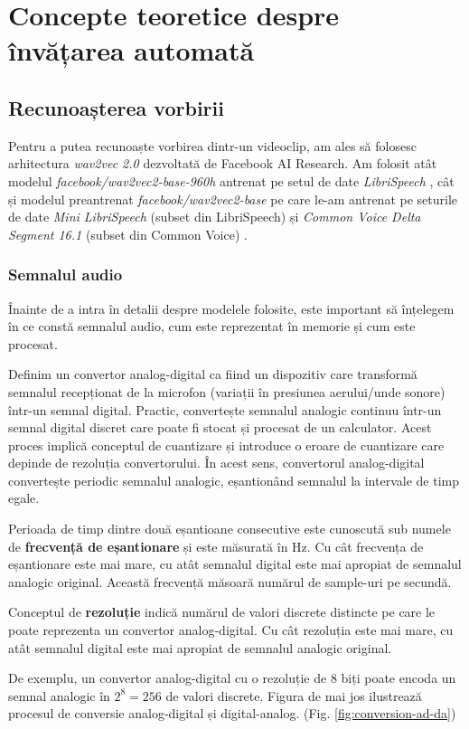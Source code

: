 \chapter{Concepte teoretice despre învățarea automată}

\section{Recunoașterea vorbirii}
Pentru a putea recunoaște vorbirea dintr-un videoclip, am ales să folosesc arhitectura
\textit{wav2vec 2.0} \cite{wav2vec2} dezvoltată de Facebook AI Research. Am folosit 
atât modelul \textit{facebook/wav2vec2-base-960h} antrenat pe setul de date 
\textit{LibriSpeech} \cite{librispeech}, cât și modelul preantrenat
\textit{facebook/wav2vec2-base} pe care le-am antrenat pe seturile
de date \textit{Mini LibriSpeech} (subset din LibriSpeech) și
\textit{Common Voice Delta Segment 16.1} (subset din Common Voice) \cite{commonvoice}.
\par

\subsection{Semnalul audio}
\label{subsec:semnal-audio}
Înainte de a intra în detalii despre modelele folosite, este important să înțelegem în 
ce constă semnalul audio, cum este reprezentat în memorie și cum este procesat.

\par
Definim un convertor analog-digital ca fiind un dispozitiv care transformă semnalul recepționat 
de la microfon (variații în presiunea aerului/unde sonore) într-un semnal digital.
Practic, convertește semnalul analogic continuu într-un
semnal digital discret care poate fi stocat și procesat de un calculator. Acest proces implică
conceptul de cuantizare și introduce o eroare de cuantizare care depinde de rezoluția convertorului.
În acest sens, convertorul analog-digital convertește periodic semnalul analogic, eșantionând semnalul
la intervale de timp egale.
\par
Perioada de timp dintre două eșantioane consecutive este cunoscută sub numele de \textbf{frecvență de eșantionare}
și este măsurată în Hz. Cu cât frecvența de eșantionare este mai mare, cu atât semnalul digital este mai apropiat
de semnalul analogic original. Această frecvență măsoară numărul de sample-uri pe secundă.
\par
Conceptul de \textbf{rezoluție} indică numărul de valori discrete distincte pe care le poate 
reprezenta un convertor analog-digital. Cu cât rezoluția este mai mare, cu atât semnalul digital
este mai apropiat de semnalul analogic original.
\par
De exemplu, un convertor analog-digital cu o rezoluție de 8 biți poate encoda un semnal analogic
în $2^8 = 256$ de valori discrete. Figura de mai jos ilustrează procesul de conversie analog-digital
și digital-analog. (Fig. \ref{fig:conversion-ad-da})

